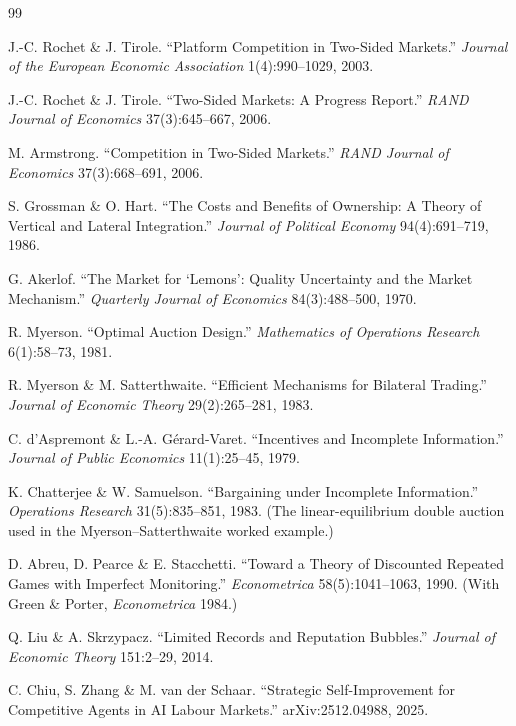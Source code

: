 \documentclass[11pt,a4paper]{article}
\theoremstyle{definition}
\theoremstyle{definition}
\theoremstyle{remark}
\begin{document}
\begin{thebibliography}{99}

 J.-C. Rochet \& J. Tirole. ``Platform Competition in Two-Sided
Markets.'' \emph{Journal of the European Economic Association} 1(4):990--1029, 2003.

 J.-C. Rochet \& J. Tirole. ``Two-Sided Markets: A Progress
Report.'' \emph{RAND Journal of Economics} 37(3):645--667, 2006.

 M. Armstrong. ``Competition in Two-Sided Markets.''
\emph{RAND Journal of Economics} 37(3):668--691, 2006.

 S. Grossman \& O. Hart. ``The Costs and Benefits of
Ownership: A Theory of Vertical and Lateral Integration.'' \emph{Journal of
Political Economy} 94(4):691--719, 1986.

 G. Akerlof. ``The Market for `Lemons': Quality Uncertainty and
the Market Mechanism.'' \emph{Quarterly Journal of Economics} 84(3):488--500, 1970.

 R. Myerson. ``Optimal Auction Design.'' \emph{Mathematics of
Operations Research} 6(1):58--73, 1981.

 R. Myerson \& M. Satterthwaite. ``Efficient Mechanisms for
Bilateral Trading.'' \emph{Journal of Economic Theory} 29(2):265--281, 1983.

 C. d'Aspremont \& L.-A. G\'erard-Varet. ``Incentives and
Incomplete Information.'' \emph{Journal of Public Economics} 11(1):25--45, 1979.

 K. Chatterjee \& W. Samuelson. ``Bargaining under
Incomplete Information.'' \emph{Operations Research} 31(5):835--851, 1983. (The
linear-equilibrium double auction used in the Myerson--Satterthwaite worked
example.)

 D. Abreu, D. Pearce \& E. Stacchetti. ``Toward a Theory of
Discounted Repeated Games with Imperfect Monitoring.'' \emph{Econometrica}
58(5):1041--1063, 1990. (With Green \& Porter, \emph{Econometrica} 1984.)

 Q. Liu \& A. Skrzypacz. ``Limited Records and Reputation
Bubbles.'' \emph{Journal of Economic Theory} 151:2--29, 2014.

 C. Chiu, S. Zhang \& M. van der Schaar. ``Strategic
Self-Improvement for Competitive Agents in AI Labour Markets.'' arXiv:2512.04988,
2025.


\end{thebibliography}
\end{document}
